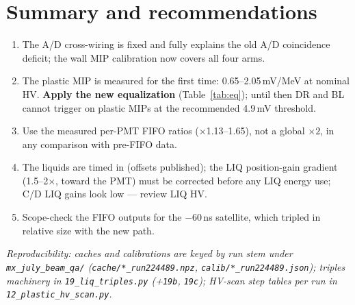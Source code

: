 \documentclass[11pt]{article}
\begin{document}
\section{Summary and recommendations}
\begin{enumerate}
\item The A/D cross-wiring is fixed and fully explains the old A/D
      coincidence deficit; the wall MIP calibration now covers all four arms.
\item The plastic MIP is measured for the first time:
      0.65--2.05\,mV/MeV at nominal HV. \textbf{Apply the new equalization}
      (Table~\ref{tab:eq}); until then DR and BL cannot trigger on plastic
      MIPs at the recommended 4.9\,mV threshold.
\item Use the measured per-PMT FIFO ratios ($\times$1.13--1.65), not a
      global $\times2$, in any comparison with pre-FIFO data.
\item The liquids are timed in (offsets published); the LIQ position-gain
      gradient (1.5--2$\times$, toward the PMT) must be corrected before any
      LIQ energy use; C/D LIQ gains look low --- review LIQ HV.
\item Scope-check the FIFO outputs for the $-60$\,ns satellite, which tripled
      in relative size with the new path.
\end{enumerate}

\vspace{1ex}
\noindent\textit{Reproducibility: caches and calibrations are keyed by run
stem under \texttt{mx\_july\_beam\_qa/} (\texttt{cache/*\_run224489.npz},
\texttt{calib/*\_run224489.json}); triples machinery in
\texttt{19\_liq\_triples.py} (+\texttt{19b}, \texttt{19c}); HV-scan step
tables per run in \texttt{12\_plastic\_hv\_scan.py}.}
\end{document}
